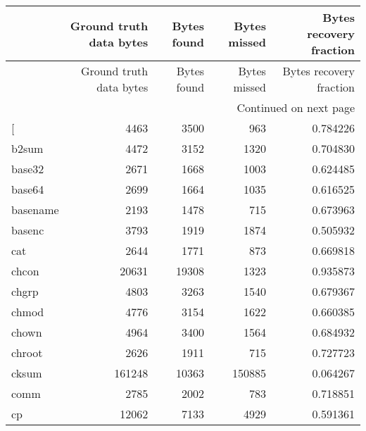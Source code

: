 \begin{longtable}{lrrrr}
\toprule
{} &  Ground truth data bytes &  Bytes found &  Bytes missed &  Bytes recovery fraction \\
\midrule
\endfirsthead

\toprule
{} &  Ground truth data bytes &  Bytes found &  Bytes missed &  Bytes recovery fraction \\
\midrule
\endhead
\midrule
\multicolumn{5}{r}{{Continued on next page}} \\
\midrule
\endfoot

\bottomrule
\endlastfoot
{[}         &                     4463 &         3500 &           963 &                 0.784226 \\
b2sum     &                     4472 &         3152 &          1320 &                 0.704830 \\
base32    &                     2671 &         1668 &          1003 &                 0.624485 \\
base64    &                     2699 &         1664 &          1035 &                 0.616525 \\
basename  &                     2193 &         1478 &           715 &                 0.673963 \\
basenc    &                     3793 &         1919 &          1874 &                 0.505932 \\
cat       &                     2644 &         1771 &           873 &                 0.669818 \\
chcon     &                    20631 &        19308 &          1323 &                 0.935873 \\
chgrp     &                     4803 &         3263 &          1540 &                 0.679367 \\
chmod     &                     4776 &         3154 &          1622 &                 0.660385 \\
chown     &                     4964 &         3400 &          1564 &                 0.684932 \\
chroot    &                     2626 &         1911 &           715 &                 0.727723 \\
cksum     &                   161248 &        10363 &        150885 &                 0.064267 \\
comm      &                     2785 &         2002 &           783 &                 0.718851 \\
cp        &                    12062 &         7133 &          4929 &                 0.591361 \\

\end{longtable}
